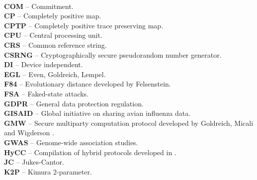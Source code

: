 \vspace{0.5cm}\\
\textbf{COM} -- Commitment.
\vspace{0.5cm}\\
\textbf{CP} -- Completely positive map.
\vspace{0.5cm}\\
\textbf{CPTP} -- Completely positive trace preserving map.
\vspace{0.5cm}\\
\textbf{CPU} -- Central processing unit.
\vspace{0.5cm}\\
\textbf{CRS} -- Common reference string.
\vspace{0.5cm}\\
\textbf{CSRNG} -- Cryptographically secure pseudorandom number generator.
\vspace{0.5cm}\\
\textbf{DI} -- Device independent.
\vspace{0.5cm}\\
\textbf{EGL} -- Even, Goldreich, Lempel.
\vspace{0.5cm}\\
\textbf{F84} -- Evolutionary distance developed by Felsenstein.
\vspace{0.5cm}\\
\textbf{FSA} -- Faked-state attacks.
\vspace{0.5cm}\\
\textbf{GDPR} -- General data protection regulation.
\vspace{0.5cm}\\
\textbf{GISAID} -- Global initiative on sharing avian influenza data.
\vspace{0.5cm}\\
\textbf{GMW} -- Secure multiparty computation protocol developed by Goldreich, Micali and Wigderson \cite{GMW87}.
\vspace{0.5cm}\\
\textbf{GWAS} -- Genome-wide association studies.
\vspace{0.5cm}\\
\textbf{HyCC} -- Compilation of hybrid protocols developed in \cite{Bscher2018}.
\vspace{0.5cm}\\
\textbf{JC} -- Jukes-Cantor.
\vspace{0.5cm}\\
\textbf{K2P} -- Kimura 2-parameter.
\vspace{0.5cm}\\
